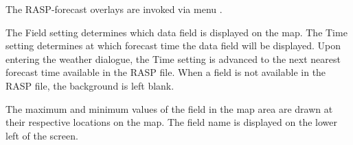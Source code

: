 The RASP-forecast overlays are invoked via menu 
.

The Field setting determines which data field is displayed on the map.
The Time setting determines at which forecast time the data field will
be displayed.  Upon entering the weather dialogue, the Time setting is
advanced to the next nearest forecast time available in the RASP file.
When a field is not available in the RASP file, the background is left blank.

The maximum and minimum values of the field in the map area are drawn
at their respective locations on the map.  The field name is displayed
on the lower left of the screen.

